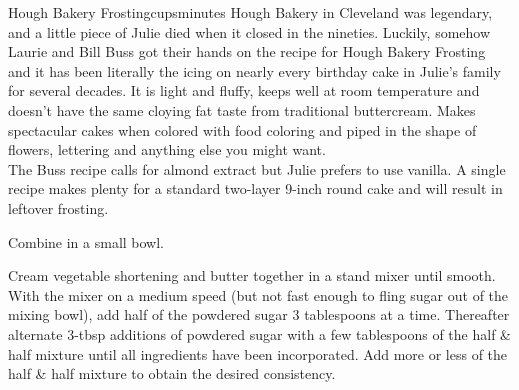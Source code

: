 \begin{recipe}{Hough Bakery Frosting}{\unit[6]{cups}}{\unit[20]{minutes}}
\freeform Hough Bakery in Cleveland was legendary, and a little piece
of Julie died when it closed in the nineties. Luckily, somehow Laurie
and Bill Buss got their hands on the recipe for Hough Bakery Frosting
and it has been literally the icing on nearly every birthday cake in
Julie's family for several decades. It is light and fluffy, keeps well
at room temperature and doesn't have the same cloying fat taste from
traditional buttercream. Makes spectacular cakes when colored with
food coloring and piped in the shape of flowers, lettering and
anything else you might want.\\

The Buss recipe calls for almond extract but Julie prefers to use
vanilla. A single recipe makes plenty for a standard two-layer 9-inch
round cake and will result in leftover frosting.

Combine in a small bowl.

Cream vegetable shortening and butter together in a stand mixer until
smooth. With the mixer on a medium speed (but not fast enough to fling
sugar out of the mixing bowl), add half of the powdered sugar 3
tablespoons at a time. Thereafter alternate 3-tbsp additions of
powdered sugar with a few tablespoons of the half \& half mixture
until all ingredients have been incorporated. Add more or less of the
half \& half mixture to obtain the desired consistency.

\end{recipe}


